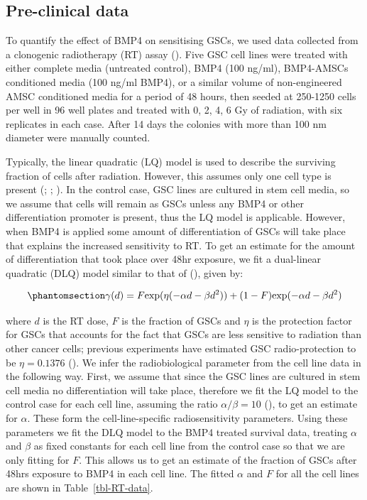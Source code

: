 \documentclass[
  letterpaper,
]{scrreprt}
\theoremstyle{definition}
\theoremstyle{remark}
\begin{document}
\subsection{Pre-clinical data}\label{sec-pre-clinical-data}

To quantify the effect of BMP4 on sensitising GSCs, we used data
collected from a clonogenic radiotherapy (RT) assay
(). Five GSC cell lines were
treated with either complete media (untreated control), BMP4 (100
ng/ml), BMP4-AMSCs conditioned media (100 ng/ml BMP4), or a similar
volume of non-engineered AMSC conditioned media for a period of 48
hours, then seeded at 250-1250 cells per well in 96 well plates and
treated with 0, 2, 4, 6 Gy of radiation, with six replicates in each
case. After 14 days the colonies with more than 100 nm diameter were
manually counted.

Typically, the linear quadratic (LQ) model is used to describe the
surviving fraction of cells after radiation. However, this assumes only
one cell type is present (; ;
). In the control case, GSC lines
are cultured in stem cell media, so we assume that cells will remain as
GSCs unless any BMP4 or other differentiation promoter is present, thus
the LQ model is applicable. However, when BMP4 is applied some amount of
differentiation of GSCs will take place that explains the increased
sensitivity to RT. To get an estimate for the amount of differentiation
that took place over 48hr exposure, we fit a dual-linear quadratic (DLQ)
model similar to that of (), given
by:

\begin{equation}\phantomsection\label{eq-DLQ}{
  \gamma(d) = F \text{exp}(\eta(-\alpha d - \beta d^2)) + (1-F)\text{exp}(-\alpha d - \beta d^2)
}\end{equation}

where \(d\) is the RT dose, \(F\) is the fraction of GSCs and \(\eta\)
is the protection factor for GSCs that accounts for the fact that GSCs
are less sensitive to radiation than other cancer cells; previous
experiments have estimated GSC radio-protection to be \(\eta = 0.1376\)
(). We infer the radiobiological
parameter from the cell line data in the following way. First, we assume
that since the GSC lines are cultured in stem cell media no
differentiation will take place, therefore we fit the LQ model to the
control case for each cell line, assuming the ratio
\(\alpha / \beta = 10\) (), to get an estimate for \(\alpha\). These form the
cell-line-specific radiosensitivity parameters. Using these parameters
we fit the DLQ model to the BMP4 treated survival data, treating
\(\alpha\) and \(\beta\) as fixed constants for each cell line from the
control case so that we are only fitting for \(F\). This allows us to
get an estimate of the fraction of GSCs after 48hrs exposure to BMP4 in
each cell line. The fitted \(\alpha\) and \(F\) for all the cell lines
are shown in Table~\ref{tbl-RT-data}.
\end{document}
